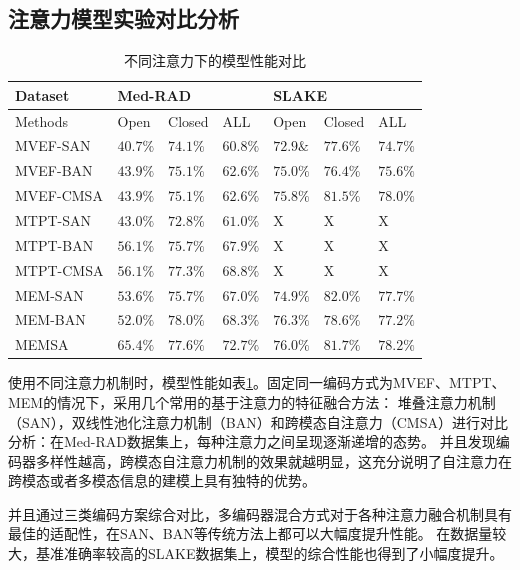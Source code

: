 \subsection{注意力模型实验对比分析}
\begin{table}
	\caption{\label{tab:modal_red_cmp2}不同注意力下的模型性能对比}
	\centering
	\small
	\begin{tabular}{l|lll|lll}
		\hline Dataset & \multicolumn{3}{l}{\textbf{Med-RAD}} & \multicolumn{3}{|l}{\textbf{SLAKE}} \\ 
		\hline Methods & Open & Closed & ALL & Open & Closed & ALL\\
		\hline MVEF-SAN\cite{nguyen2019overcoming} & $40.7 \%$ & $74.1 \%$ & $60.8 \%$ & $72.9 \&$ & $77.6 \%$ & $74.7 \%$\\
		MVEF-BAN\cite{nguyen2019overcoming} & $43.9 \%$ & $75.1 \%$ & $62.6 \%$ & $75.0 \%$ & $76.4 \%$ & $75.6 \%$\\
		MVEF-CMSA & $43.9 \%$ & $75.1 \%$ & $62.6 \%$ & $75.8 \%$ & $81.5\%$ & $78.0\%$\\
		\hline MTPT-SAN & $43.0 \%$ & $72.8 \%$ & $61.0 \%$ & X & X & X\\
		MTPT-BAN\cite{gong2021cross} & $56.1 \%$ & $75.7 \%$ & $67.9 \%$ & X & X & X\\
		MTPT-CMSA\cite{gong2021cross} & $56.1 \%$ & $77.3 \%$ & $68.8 \%$ & X & X & X\\
		\hline MEM-SAN & $53.6 \%$ & $75.7 \%$ & $67.0 \%$ & $74.9 \%$ & $82.0 \%$ & $77.7 \%$\\
		MEM-BAN & $52.0 \%$ & $78.0 \%$ & $68.3 \%$ & $\mathbf{76.3} \%$ & $78.6 \%$ & $77.2 \%$\\
		MEMSA & $\mathbf{65.4 \%}$ & $77.6 \%$ & $\mathbf{72.7 \%}$ & $76.0 \%$ & $81.7 \%$ & $\mathbf{78.2 \%}$\\
		\hline
		\end{tabular}
\end{table}
使用不同注意力机制时，模型性能如表\ref{tab:modal_red_cmp2}。固定同一编码方式为MVEF、MTPT、MEM的情况下，采用几个常用的基于注意力的特征融合方法：
堆叠注意力机制（SAN），双线性池化注意力机制（BAN）和跨模态自注意力（CMSA）进行对比分析：在Med-RAD数据集上，每种注意力之间呈现逐渐递增的态势。
并且发现编码器多样性越高，跨模态自注意力机制的效果就越明显，这充分说明了自注意力在跨模态或者多模态信息的建模上具有独特的优势。

并且通过三类编码方案综合对比，多编码器混合方式对于各种注意力融合机制具有最佳的适配性，在SAN、BAN等传统方法上都可以大幅度提升性能。
在数据量较大，基准准确率较高的SLAKE数据集上，模型的综合性能也得到了小幅度提升。


